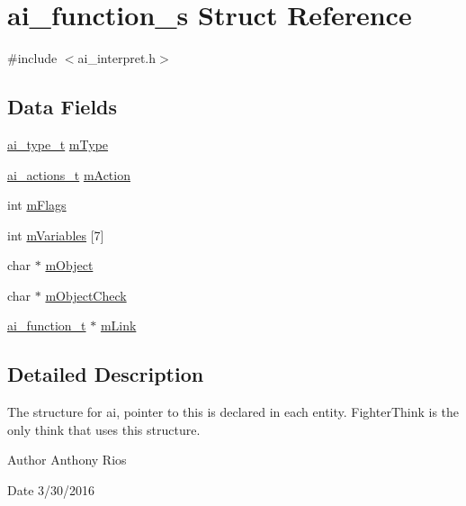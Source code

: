 \hypertarget{structai__function__s}{}\section{ai\+\_\+function\+\_\+s Struct Reference}
\label{structai__function__s}


{\ttfamily \#include $<$ai\+\_\+interpret.\+h$>$}

\subsection*{Data Fields}
\begin{DoxyCompactItemize}
\item 
\hyperlink{ai__interpret_8h_a9fc7d2b2756bda7167434e15ddd43159}{ai\+\_\+type\+\_\+t} \hyperlink{structai__function__s_af4cc7fbcaa3a1268cb1a174203486a8c}{m\+Type}
\item 
\hyperlink{ai__interpret_8h_a42492ef6b9956883af49be159eb55dff}{ai\+\_\+actions\+\_\+t} \hyperlink{structai__function__s_a99f128ebf8f9bb2be7e2ffaee33c5554}{m\+Action}
\item 
int \hyperlink{structai__function__s_ab64996ddf8cd7006232fcb79bc296b03}{m\+Flags}
\item 
int \hyperlink{structai__function__s_a889d5923f6b7628af2fe824149b5a942}{m\+Variables} \mbox{[}7\mbox{]}
\item 
char $\ast$ \hyperlink{structai__function__s_ad290bc1093389f523421449cfcab6a9c}{m\+Object}
\item 
char $\ast$ \hyperlink{structai__function__s_ae9037e9c23c85312470746c5c4379814}{m\+Object\+Check}
\item 
\hyperlink{ai__interpret_8h_a93e23f66130135adeb83b13c29f36fca}{ai\+\_\+function\+\_\+t} $\ast$ \hyperlink{structai__function__s_a7965c244eab12a7cdc29c447b8c76dbc}{m\+Link}
\end{DoxyCompactItemize}


\subsection{Detailed Description}
The structure for ai, pointer to this is declared in each entity. Fighter\+Think is the only think that uses this structure.

\begin{DoxyAuthor}{Author}
Anthony Rios 
\end{DoxyAuthor}
\begin{DoxyDate}{Date}
3/30/2016 
\end{DoxyDate}


